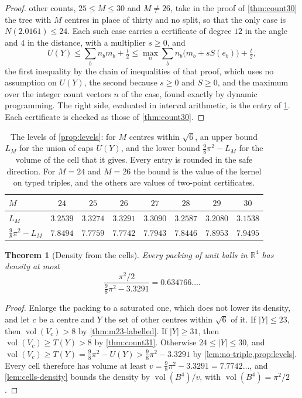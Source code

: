 \documentclass[11pt,reqno]{amsart}
\renewcommand{\_}{\origunderscore\allowbreak}
\numberwithin{equation}{section}
\theoremstyle{plain}
\newtheorem{thm}{Theorem}[section]
\theoremstyle{definition}
\theoremstyle{remark}
\DeclareMathOperator{\vol}{vol}
\begin{document}
\begin{proof}
other counts, $25\le M\le30$ and $M\ne26$, take in
the proof of \cref{thm:count30} the tree with $M$ centres in place of thirty
and no split, so that the only case is $N(2.0161)\le24$. Each such case
carries a certificate of degree $12$ in the angle and $4$ in the distance,
with a multiplier $s\ge0$, and
\[
  U(Y)\le\sum_bn_bm_b+\tfrac t2\le\max_n\sum_bn_b\bigl(m_b+sS(e_b)\bigr)+\tfrac t2,
\]
the first inequality by the chain of inequalities of that proof, which
uses no assumption on $U(Y)$, the second because $s\ge0$ and $S\ge0$, and
the maximum over the integer count vectors $n$ of the case, found exactly
by dynamic programming. The right side, evaluated in interval arithmetic,
is the entry of \cref{tab:levels}. Each certificate is checked as those of
\cref{thm:count30}.
\end{proof}

\begin{table}[tb]
\centering
\caption{The levels of \cref{prop:levels}: for $M$ centres within $\sqrt6$,
an upper bound $L_M$ for the union of caps $U(Y)$, and the lower bound
$\frac98\pi^2-L_M$ for the volume of the cell that it gives. Every entry is
rounded in the safe direction. For $M=24$ and $M=26$ the bound is the value
of the kernel on typed triples, and the others are values of two-point
certificates.}
\label{tab:levels}
\begin{tabular}{@{}lccccccc@{}}
\toprule
$M$ & $24$ & $25$ & $26$ & $27$ & $28$ & $29$ & $30$\\
\midrule
$L_M$ & $3.2539$ & $3.3274$ & $3.3291$ & $3.3090$ & $3.2587$ & $3.2080$ & $3.1538$\\
$\frac98\pi^2-L_M$ & $7.8494$ & $7.7759$ & $7.7742$ & $7.7943$ & $7.8446$ & $7.8953$ & $7.9495$\\
\bottomrule
\end{tabular}
\end{table}

\begin{thm}[Density from the cells]\label{thm:density-cells}
Every packing of unit balls in $\mathbb{R}^4$ has density at most
\[
  \frac{\pi^2/2}{\frac98\pi^2-3.3291}=0.634766\ldots .
\]
\end{thm}

\begin{proof}
Enlarge the packing to a saturated one, which does not lower its density,
and let $c$ be a centre and $Y$ the set of other centres within $\sqrt6$ of
it. If $|Y|\le23$, then $\vol(V_c)>8$ by \cref{thm:m23-labelled}. If
$|Y|\ge31$, then $\vol(V_c)\ge T(Y)>8$ by \cref{thm:count31}. Otherwise
$24\le|Y|\le30$, and $\vol(V_c)\ge T(Y)=\frac98\pi^2-U(Y)>\frac98\pi^2-3.3291$
by \cref{lem:no-triple,prop:levels}. Every cell therefore has volume at least
$v=\frac98\pi^2-3.3291=7.7742\ldots$, and \cref{lem:cells-density} bounds the
density by $\vol(B^4)/v$, with $\vol(B^4)=\pi^2/2$.
\end{proof}
\end{document}

